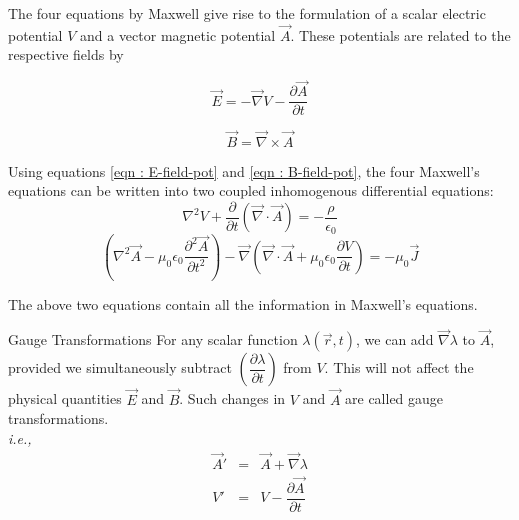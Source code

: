 \documentclass[10pt,aspectratio=169]{beamer}
\newcommand{\Div}[1]{\vec{\nabla}\cdot\vec{#1}}
\newcommand{\Curl}[1]{\vec{\nabla}\times\vec{#1}}
\newcommand{\Grad}{\vec{\nabla}}
\newcommand{\Lap}{\nabla^{2}}
\newcommand{\pdert}[1]{\dfrac{\partial#1}{\partial t}}
\newcommand{\pdertt}[1]{\dfrac{\partial^2#1}{\partial t^2}}
\newcommand{\A}{\vec{A}}
\newcommand{\za}[1]{\alert{#1}}
\begin{document}
	\begin{frame}%
		The four equations by Maxwell give rise to the formulation of a \za{scalar electric potential} $ V $ and a \za{vector magnetic potential} $ \vec{A} $. These potentials are related to the respective fields by
			
			\begin{equation}\label{eqn : E-field-pot}
				\vec{E} = -\vec{\nabla}V - \pdert{\vec{A}}
			\end{equation}
			
			\begin{equation}\label{eqn : B-field-pot}
			\vec{B} = \Curl{A}
			\end{equation}
			
	Using equations \ref{eqn : E-field-pot} and \ref{eqn : B-field-pot}, the four Maxwell's equations can be written into two coupled inhomogenous differential equations:
	\begin{equation}\label{eqn : inhomo-1}
		\Lap V + \pdert{ }\left(\Div{A}\right) = - \dfrac{\rho}{\epsilon_0}
	\end{equation}
	\begin{equation}\label{eqn : inhomo-2}
		\left( \Lap \vec{A} - \mu_0\epsilon_0 \pdertt{\vec{A}}\right)  - \vec{\nabla}\left( \Div{A} + \mu_0\epsilon_0 \pdert{V} \right) = -\mu_0 \vec{J}
	\end{equation}
	
	The above two equations  contain all the information in Maxwell’s equations.
	\end{frame}

	\begin{frame}{Gauge Transformations}
		For any scalar function $\lambda(\vec{r}, t)$, we can add $ \Grad\lambda $ to $\A$, provided we simultaneously subtract $ \left(\pdert{\lambda}\right) $ from $ V $. This will not affect the
		physical quantities $ \vec{E} $ and $ \vec{B} $. Such changes in $ V $ and $\A $ are called \za{gauge transformations}. \\
		\textit{i.e.,}
		\begin{eqnarray}
			\A' &=& \A + \Grad \lambda\\
			V'  &=& V - \pdert{\A}
		\end{eqnarray}
	\end{frame}
\end{document}
